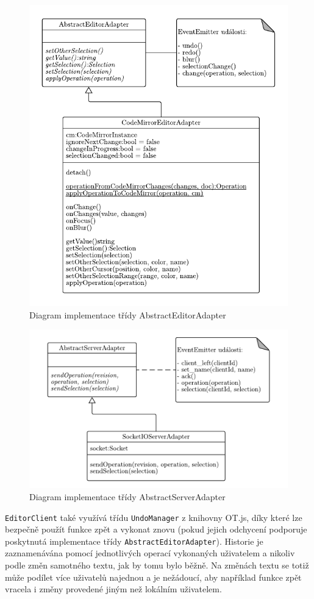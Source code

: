 \begin{figure}[ht!]
    \centering
    \includegraphics[width=.8\textwidth]{partials/navrh/editor/AbstractEditorAdapter.pdf}
    \caption{Diagram implementace třídy AbstractEditorAdapter}\label{fig:AbstractEditorAdapter}
\end{figure}

\begin{figure}[ht!]
    \centering
    \includegraphics[width=.8\textwidth]{partials/navrh/editor/AbstractServerAdapter.pdf}
    \caption{Diagram implementace třídy AbstractServerAdapter}\label{fig:AbstractServerAdapter}
\end{figure}

\pagebreak

\texttt{EditorClient} také využívá třídu \texttt{UndoManager} z knihovny OT.js, díky které lze bezpečně použít funkce zpět a vykonat znovu (pokud jejich odchycení podporuje poskytnutá implementace třídy \texttt{AbstractEditorAdapter}).
Historie je zaznamenávána pomocí jednotlivých operací vykonaných uživatelem a nikoliv podle změn samotného textu, jak by tomu bylo běžně.
Na změnách textu se totiž může podílet více uživatelů najednou a je nežádoucí, aby například funkce zpět vracela i změny provedené jiným než lokálním uživatelem.


